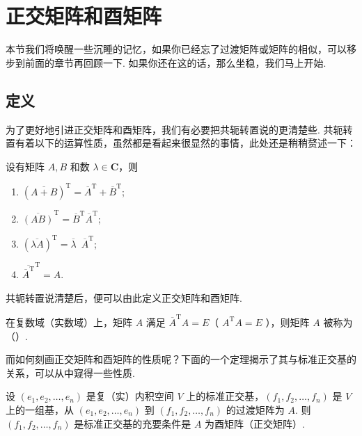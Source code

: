\section{正交矩阵和酉矩阵}

本节我们将唤醒一些沉睡的记忆，如果你已经忘了过渡矩阵或矩阵的相似，可以移步到前面的章节再回顾一下. 如果你还在这的话，那么坐稳，我们马上开始.

\subsection{定义}

为了更好地引进正交矩阵和酉矩阵，我们有必要把共轭转置说的更清楚些. 共轭转置有着以下的运算性质，虽然都是看起来很显然的事情，此处还是稍稍赘述一下：

设有矩阵 $ A, B $ 和数 $ \lambda \in \mathbf{C}$，则

\begin{enumerate}
    \item $ (\overline{A + B})^{\mathrm{T}} = \overline{A}^{\mathrm{T}} + \overline{B}^{\mathrm{T}} $;

    \item $ \overline{(AB)}^{\mathrm{T}} = \overline{B}^{\mathrm{T}} \overline{A}^{\mathrm{T}} $;

    \item $ (\overline{\lambda A})^{\mathrm{T}} = \overline{\lambda} \enspace \overline{A}^{\mathrm{T}} $;

    \item $ \overline{\overline{A}^{\mathrm{T}}}^{\mathrm{T}} = A $.
\end{enumerate}

共轭转置说清楚后，便可以由此定义正交矩阵和酉矩阵.

\begin{definition}  
    在复数域（实数域）上，矩阵 $ A $ 满足 $ \overline{A}^{\mathrm{T}} A = E $（ $ {A}^{\mathrm{T}} A = E $ ），则矩阵 $ A $ 被称为（）.
\end{definition}

而如何刻画正交矩阵和酉矩阵的性质呢？下面的一个定理揭示了其与标准正交基的关系，可以从中窥得一些性质.

\begin{theorem}
    设 $ (e_1, e_2, \ldots , e_n) $ 是复（实）内积空间 $ V $ 上的标准正交基，$ (f_1, f_2, \ldots , f_n) $ 是 $ V $ 上的一组基，从 $ (e_1, e_2, \ldots , e_n) $ 到 $ (f_1, f_2, \ldots , f_n) $ 的过渡矩阵为 $ A $. 则 $ (f_1, f_2, \ldots , f_n) $ 是标准正交基的充要条件是 $ A $ 为酉矩阵（正交矩阵）.
\end{theorem}

